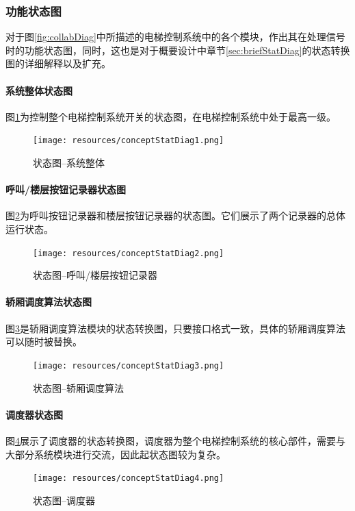 \subsubsection{功能状态图}
对于图\ref{fig:collabDiag}中所描述的电梯控制系统中的各个模块，作出其在处理信号时的功能状态图，同时，这也是对于概要设计中章节\ref{sec:briefStatDiag}的状态转换图的详细解释以及扩充。

\paragraph{系统整体状态图}
图\ref{fig:conceptStatDiag1}为控制整个电梯控制系统开关的状态图，在电梯控制系统中处于最高一级。
\begin{figure}[H]
	\centering
	\texttt{[image: resources/conceptStatDiag1.png]}
	\caption{状态图--系统整体}
	\label{fig:conceptStatDiag1}
\end{figure}

\paragraph{呼叫/楼层按钮记录器状态图}
图\ref{fig:conceptStatDiag2}为呼叫按钮记录器和楼层按钮记录器的状态图。它们展示了两个记录器的总体运行状态。
\begin{figure}[H]
	\centering
	\texttt{[image: resources/conceptStatDiag2.png]}
	\caption{状态图--呼叫/楼层按钮记录器}
	\label{fig:conceptStatDiag2}
\end{figure}

\paragraph{轿厢调度算法状态图}
图\ref{fig:conceptStatDiag3}是轿厢调度算法模块的状态转换图，只要接口格式一致，具体的轿厢调度算法可以随时被替换。
\begin{figure}[H]
	\centering
	\texttt{[image: resources/conceptStatDiag3.png]}
	\caption{状态图--轿厢调度算法}
	\label{fig:conceptStatDiag3}
\end{figure}

\paragraph{调度器状态图}
图\ref{fig:conceptStatDiag4}展示了调度器的状态转换图，调度器为整个电梯控制系统的核心部件，需要与大部分系统模块进行交流，因此起状态图较为复杂。
\begin{figure}[H]
	\centering
	\texttt{[image: resources/conceptStatDiag4.png]}
	\caption{状态图--调度器}
	\label{fig:conceptStatDiag4}
\end{figure}

